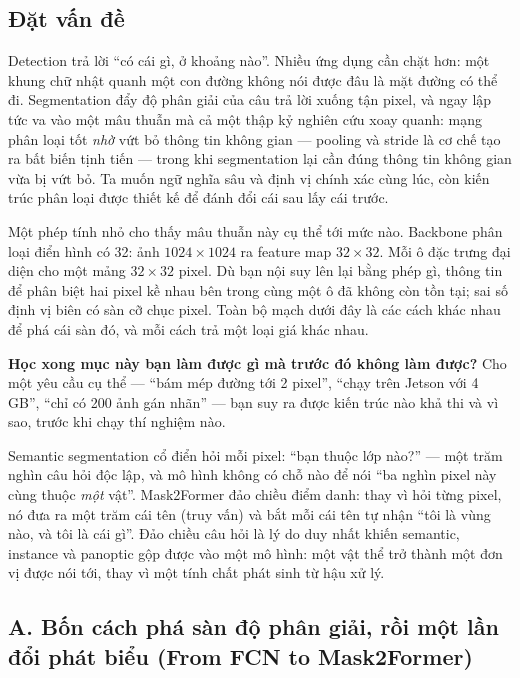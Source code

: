 \documentclass[../../../deep_learning.tex]{subfiles}
\begin{document}
\subsection{Đặt vấn đề}
Detection trả lời ``có cái gì, ở khoảng nào''. Nhiều ứng dụng cần chặt hơn: một khung chữ nhật quanh một con đường không nói được đâu là mặt đường có thể đi. Segmentation đẩy độ phân giải của câu trả lời xuống tận pixel, và ngay lập tức va vào một mâu thuẫn mà cả một thập kỷ nghiên cứu xoay quanh: mạng phân loại tốt \emph{nhờ} vứt bỏ thông tin không gian --- pooling và stride là cơ chế tạo ra bất biến tịnh tiến --- trong khi segmentation lại cần đúng thông tin không gian vừa bị vứt bỏ. Ta muốn ngữ nghĩa sâu và định vị chính xác cùng lúc, còn kiến trúc phân loại được thiết kế để đánh đổi cái sau lấy cái trước.

Một phép tính nhỏ cho thấy mâu thuẫn này cụ thể tới mức nào. Backbone phân loại điển hình có  32: ảnh \(1024\times1024\) ra feature map \(32\times32\). Mỗi ô đặc trưng đại diện cho một mảng \(32\times32\) pixel. Dù bạn nội suy lên lại bằng phép gì, thông tin để phân biệt hai pixel kề nhau bên trong cùng một ô đã không còn tồn tại; sai số định vị biên có sàn cỡ chục pixel. Toàn bộ mạch dưới đây là các cách khác nhau để phá cái sàn đó, và mỗi cách trả một loại giá khác nhau.

\textbf{Học xong mục này bạn làm được gì mà trước đó không làm được?} Cho một yêu cầu cụ thể --- ``bám mép đường tới 2 pixel'', ``chạy trên Jetson với 4\,GB'', ``chỉ có 200 ảnh gán nhãn'' --- bạn suy ra được kiến trúc nào khả thi và vì sao, trước khi chạy thí nghiệm nào.

\begin{trucgiac}
Semantic segmentation cổ điển hỏi mỗi pixel: ``bạn thuộc lớp nào?'' --- một trăm nghìn câu hỏi độc lập, và mô hình không có chỗ nào để nói ``ba nghìn pixel này cùng thuộc \emph{một} vật''. Mask2Former đảo chiều điểm danh: thay vì hỏi từng pixel, nó đưa ra một trăm cái tên (truy vấn) và bắt mỗi cái tên tự nhận ``tôi là vùng nào, và tôi là cái gì''. Đảo chiều câu hỏi là lý do duy nhất khiến semantic, instance và panoptic gộp được vào một mô hình: một vật thể trở thành một đơn vị được nói tới, thay vì một tính chất phát sinh từ hậu xử lý.
\end{trucgiac}

\subsection{A. Bốn cách phá sàn độ phân giải, rồi một lần đổi phát biểu (From FCN to Mask2Former)}
\end{document}
